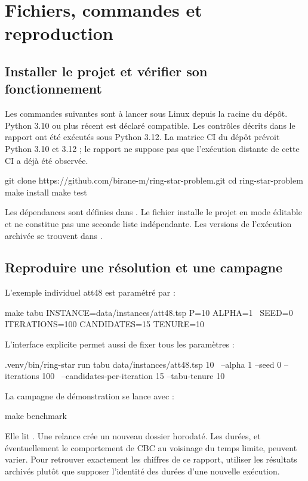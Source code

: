 \chapter{Fichiers, commandes et reproduction}
\section{Installer le projet et vérifier son fonctionnement}
Les commandes suivantes sont à lancer sous Linux depuis la racine du
dépôt. Python 3.10 ou plus récent est déclaré compatible. Les contrôles
décrits dans le rapport ont été exécutés sous Python 3.12. La matrice CI
du dépôt prévoit Python 3.10 et 3.12 ; le rapport ne suppose pas que
l'exécution distante de cette CI a déjà été observée.
\begin{commandes}
git clone https://github.com/birane-m/ring-star-problem.git
cd ring-star-problem
make install
make test
\end{commandes}
Les dépendances sont définies dans . Le fichier
 installe le projet en mode éditable et ne
constitue pas une seconde liste indépendante. Les versions de l'exécution
archivée se trouvent dans .

\section{Reproduire une résolution et une campagne}
L'exemple individuel att48 est paramétré par :
\begin{commandes}
make tabu INSTANCE=data/instances/att48.tsp P=10 ALPHA=1 \
  SEED=0 ITERATIONS=100 CANDIDATES=15 TENURE=10
\end{commandes}
L'interface explicite permet aussi de fixer tous les paramètres :
\begin{commandes}
.venv/bin/ring-star run tabu data/instances/att48.tsp 10 \
  --alpha 1 --seed 0 --iterations 100 \
  --candidates-per-iteration 15 --tabu-tenure 10
\end{commandes}
La campagne de démonstration se lance avec :
\begin{commandes}
make benchmark
\end{commandes}
Elle lit . Une relance crée un nouveau
dossier horodaté. Les durées, et éventuellement le comportement de CBC
au voisinage du temps limite, peuvent varier. Pour retrouver exactement
les chiffres de ce rapport, utiliser les résultats archivés plutôt que
supposer l'identité des durées d'une nouvelle exécution.


